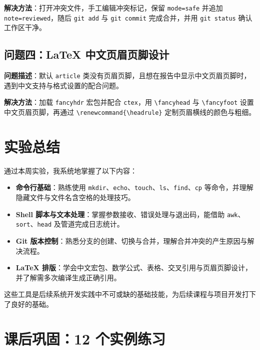 \documentclass[a4paper, 12pt]{article}
\begin{document}
\textbf{解决方法}：打开冲突文件，手工编辑冲突标记，保留 \texttt{mode=safe} 并追加 \texttt{note=reviewed}，随后 \texttt{git add} 与 \texttt{git commit} 完成合并，并用 \texttt{git status} 确认工作区干净。

\subsection{问题四：\LaTeX{} 中文页眉页脚设计}

\textbf{问题描述}：默认 \texttt{article} 类没有页眉页脚，且想在报告中显示中文页眉页脚时，遇到中文支持与格式设置的配合问题。

\textbf{解决方法}：加载 \texttt{fancyhdr} 宏包并配合 \texttt{ctex}，用 \texttt{\textbackslash fancyhead} 与 \texttt{\textbackslash fancyfoot} 设置中文页眉页脚，再通过 \texttt{\textbackslash renewcommand\{\textbackslash headrule\}} 定制页眉横线的颜色与粗细。

\section{实验总结}

通过本周实验，我系统地掌握了以下内容：

\begin{itemize}
  \item \textbf{命令行基础}：熟练使用 \texttt{mkdir}、\texttt{echo}、\texttt{touch}、\texttt{ls}、\texttt{find}、\texttt{cp} 等命令，并理解隐藏文件与文件名含空格的处理技巧。
  \item \textbf{Shell 脚本与文本处理}：掌握参数接收、错误处理与退出码，能借助 \texttt{awk}、\texttt{sort}、\texttt{head} 及管道完成日志统计。
  \item \textbf{Git 版本控制}：熟悉分支的创建、切换与合并，理解合并冲突的产生原因与解决流程。
  \item \textbf{\LaTeX{} 排版}：学会中文宏包、数学公式、表格、交叉引用与页眉页脚设计，并了解需多次编译生成正确引用。
\end{itemize}

这些工具是后续系统开发实践中不可或缺的基础技能，为后续课程与项目开发打下了良好的基础。

\section{课后巩固：12 个实例练习}
\end{document}
